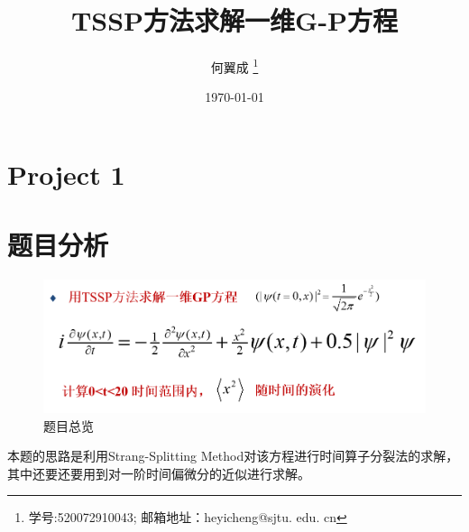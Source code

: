 \documentclass[UTF8,a4paper,10pt]{ctexart}
\title{\textbf{TSSP方法求解一维G-P方程}}
\author{ 何翼成 \thanks{学号:520072910043; \newline
    邮箱地址：heyicheng@sjtu. edu. cn} }
\date{\today}
\begin{document}
\maketitle

\section*{Project 1}
\section{题目分析}
	\begin{figure}[!htbp]
		\centering
		\includegraphics[width=1\textwidth,height=0.2\textwidth]{pictures/pro.png}
		\caption{题目总览} \label{project1}
	\end{figure}

  本题的思路是利用Strang-Splitting Method对该方程进行时间算子分裂法的求解，其中还要还要用到对一阶时间偏微分的近似进行求解。
\end{document}
